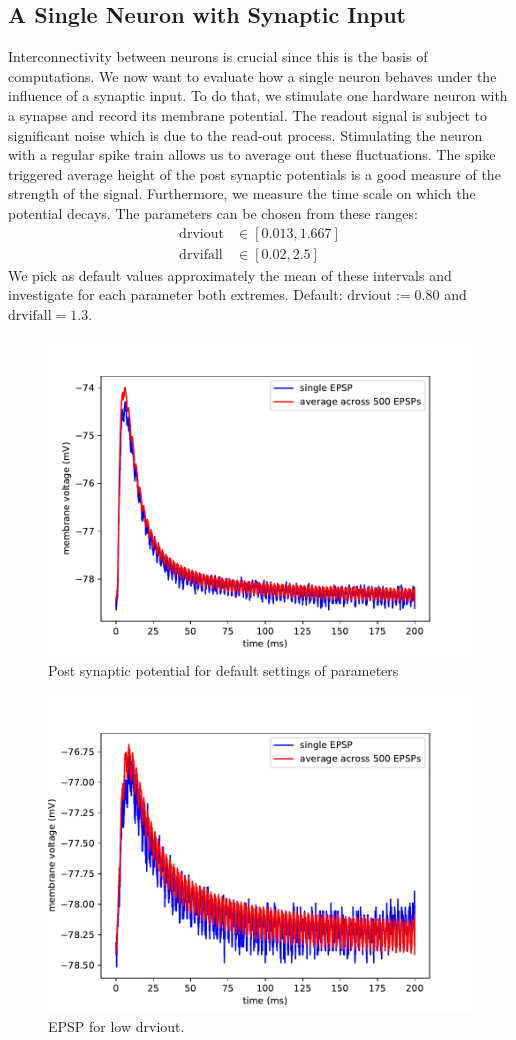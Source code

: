 \documentclass[a4paper,twocolumn]{article}
\begin{document}
\subsection{A Single Neuron with Synaptic Input}
Interconnectivity between neurons is crucial since this is the basis of 
computations.  We now want to evaluate how a single neuron behaves under the influence
 of a synaptic input.  To do that,  we stimulate one hardware neuron with a synapse 
 and record its membrane potential.  The readout signal is subject to significant 
 noise which is due to the read-out process.  Stimulating the neuron with a regular 
 spike train allows us to average out these fluctuations.  The spike triggered average 
 height of the post synaptic potentials is a good measure of the strength of the signal.  
 Furthermore,  we measure the time scale on which the potential decays.  
The parameters can be chosen from these ranges:
\begin{align*}
	\text{drviout} &\in \left[ 0.013, 1.667  \right] \\
	\text{drvifall} &\in \left[ 0.02,  2.5  \right] 
\end{align*}
We pick as default values approximately the mean of these intervals and 
investigate for each parameter both extremes.  Default: $\text{drviout} := 0.80$ 
and $\text{drvifall}=1.3$.  
\begin{figure}[ht]
    \centering
    \includegraphics[width=.5\textwidth]{figures/epsp_default.pdf}
    \caption{Post synaptic potential for default settings of parameters}
    \label{fig:epsp_default}
\end{figure}
\begin{figure}[ht]
    \centering
    \includegraphics[width=.5\textwidth]{figures/epsp_out_-.pdf}
    \caption{EPSP for low drviout.}
    \label{fig:epsp_out-}
\end{figure}
\end{document}
